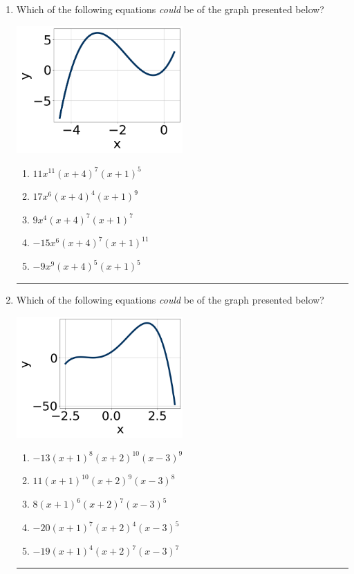 \documentclass[14pt]{extbook}
\newcommand{\litem}[1]{\item#1\hspace*{-1cm}\rule{\textwidth}{0.4pt}}
\begin{document}
\begin{enumerate}
\litem{
Which of the following equations \textit{could} be of the graph presented below?
\begin{center}
    \includegraphics[width=0.5\textwidth]{../Figures/polyGraphToFunctionCopyC.png}
\end{center}
\begin{enumerate}[label=\Alph*.]
\item \( 11x^{11} (x + 4)^{7} (x + 1)^{5} \)
\item \( 17x^{6} (x + 4)^{4} (x + 1)^{9} \)
\item \( 9x^{4} (x + 4)^{7} (x + 1)^{7} \)
\item \( -15x^{6} (x + 4)^{7} (x + 1)^{11} \)
\item \( -9x^{9} (x + 4)^{5} (x + 1)^{5} \)

\end{enumerate} }
\litem{
Which of the following equations \textit{could} be of the graph presented below?
\begin{center}
    \includegraphics[width=0.5\textwidth]{../Figures/polyGraphToFunctionC.png}
\end{center}
\begin{enumerate}[label=\Alph*.]
\item \( -13(x + 1)^{8} (x + 2)^{10} (x - 3)^{9} \)
\item \( 11(x + 1)^{10} (x + 2)^{9} (x - 3)^{8} \)
\item \( 8(x + 1)^{6} (x + 2)^{7} (x - 3)^{5} \)
\item \( -20(x + 1)^{7} (x + 2)^{4} (x - 3)^{5} \)
\item \( -19(x + 1)^{4} (x + 2)^{7} (x - 3)^{7} \)


\end{enumerate}}
\end{enumerate}
\end{document}

